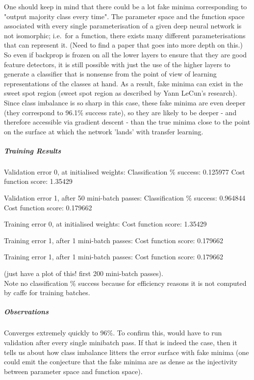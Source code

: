 \documentclass[a4paper,11pt]{article}
\begin{document}
One should keep in mind that there could be a lot fake minima corresponding to "output majority class every time". The parameter space and the function space associated with every single parameterisation of a given deep neural network is not isomorphic; i.e.\ for a function, there exists many different parameterisations that can represent it. (Need to find a paper that goes into more depth on this.) \\

So even if backprop is frozen on all the lower layers to ensure that they are good feature detectors, it is still possible with just the use of the higher layers to generate a classifier that is nonsense from the point of view of learning representations of the classes at hand. As a result, fake minima can exist in the sweet spot region (sweet spot region as described by Yann LeCun's research). Since class imbalance is so sharp in this case, these fake minima are even deeper (they correspond to 96.1\% success rate), so they are likely to be deeper - and therefore accessible via gradient descent - than the true minima close to the point on the surface at which the network 'lands' with transfer learning. \\

\subparagraph{Training Results}

Validation error 0, at initialised weights:
Classification \% success: 0.125977
Cost function score: 1.35429

Validation error 1, after 50 mini-batch passes:
Classification \% success: 0.964844
Cost function score: 0.179662

Training error 0, at initialised weights:
Cost function score: 1.35429

Training error 1, after 1 mini-batch passes:
Cost function score: 0.179662

Training error 1, after 1 mini-batch passes:
Cost function score: 0.179662

(just have a plot of this! first 200 mini-batch passes). \\
Note no classification \% success because for efficiency reasons it is not computed by caffe for training batches.

\subparagraph{Observations}

Converges extremely quickly to 96\%. To confirm this, would have to run validation after every single minibatch pass. If that is indeed the case, then it tells us about how class imbalance litters the error surface with fake minima (one could emit the conjecture that the fake minima are as dense as the injectivity between parameter space and function space).
\end{document}
